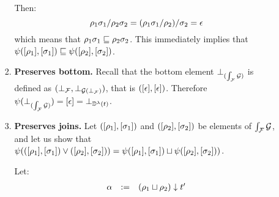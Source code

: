 \begin{enumerate}
\begin{enumerate}
\begin{enumerate}
      Then:
      \[
        \rho_1\sigma_1/\rho_2\sigma_2
        = (\rho_1\sigma_1/\rho_2)/\sigma_2
        = \epsilon
      \]
      which means that $\rho_1\sigma_1 \sqsubseteq \rho_2\sigma_2$.
      This immediately implies that
      $\psi({[\rho_1]},{[\sigma_1]}) \sqsubseteq \psi({[\rho_2]},{[\sigma_2]})$.
    \item {\bf Preserves bottom.}
      Recall that the bottom element $\bot_{(\int_{\mathcal{F}}{\mathcal{G}})}$
      is defined as $(\bot_{\mathcal{F}}, \bot_{\mathcal{G}(\bot_{\mathcal{F}})})$, that is
      $({[\epsilon]}, {[\epsilon]})$.
      Therefore $\psi(\bot_{(\int_{\mathcal{F}}{\mathcal{G}})}) = {[\epsilon]} = \bot_{\mathbb{D}^{\lambda}(t)}$.
    \item {\bf Preserves joins.}
      Let $({[\rho_1]},{[\sigma_1]})$ and $({[\rho_2]},{[\sigma_2]})$
      be elements of $\int_{\mathcal{F}}{\mathcal{G}}$, and let us show that
      $\psi(({[\rho_1]},{[\sigma_1]}) \lor ({[\rho_2]},{[\sigma_2]})) =
       \psi({[\rho_1]},{[\sigma_1]}) \sqcup \psi({[\rho_2]},{[\sigma_2]}))$.

      Let:
      \[
      \begin{array}{rcl}
        \alpha & := & (\rho_1 \sqcup \rho_2) \downarrow t'
      \end{array}
      \]


\end{enumerate}
\end{enumerate}
\end{enumerate}
